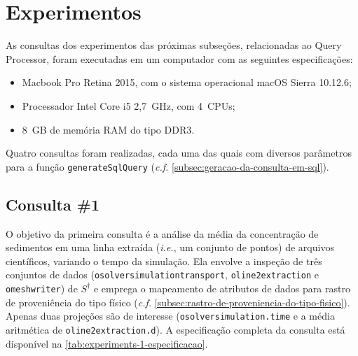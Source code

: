 

\section{Experimentos}

As consultas dos experimentos das próximas subseções, relacionadas ao Query Processor, foram executadas em um computador com as seguintes especificações:

\begin{itemize}
	\item Macbook Pro Retina 2015, com o sistema operacional macOS Sierra 10.12.6;
    \item Processador Intel Core i5 2,7~GHz, com 4~CPUs;
    \item 8~GB de memória RAM do tipo DDR3.
\end{itemize}

Quatro consultas foram realizadas, cada uma das quais com diversos parâmetros para a função \texttt{generateSqlQuery} (\textit{c.f.} \autoref{subsec:geracao-da-consulta-em-sql}).

\subsection{Consulta \#1}

%

%

O objetivo da primeira consulta é a análise da média da concentração de sedimentos em uma linha extraída (\textit{i.e.}, um conjunto de pontos) de arquivos científicos, variando o tempo da simulação. Ela envolve a inspeção de três conjuntos de dados (\texttt{osolversimulationtransport}, \texttt{oline2extraction} e \texttt{omeshwriter}) de \(S^{\dagger}\) e emprega o mapeamento de atributos de dados para rastro de proveniência do tipo físico (\textit{c.f.} \autoref{subsec:rastro-de-proveniencia-do-tipo-fisico}). Apenas duas projeções são de interesse (\texttt{osolversimulation.time} e a média aritmética de \texttt{oline2extraction.d}). A especificação completa da consulta está disponível na \autoref{tab:experiments-1-especificacao}.

